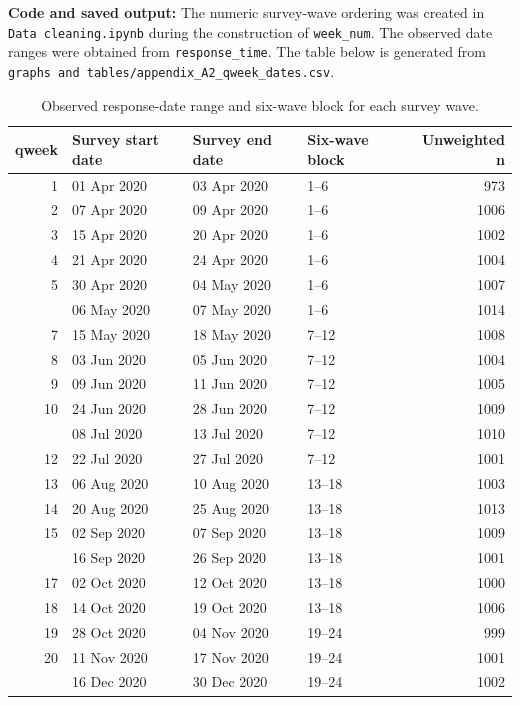 \documentclass[
  12pt,
  a4paper,
]{article}
\begin{document}
\textbf{Code and saved output:} The numeric survey-wave ordering was created
in \texttt{Data\ cleaning.ipynb} during the construction of \texttt{week\_num}. The
observed date ranges were obtained from \texttt{response\_time}. The table below
is generated from \texttt{graphs\ and\ tables/appendix\_A2\_qweek\_dates.csv}.

\begin{longtable}[t]{rlllr}
\caption{\label{tab:qweek-dates}Observed response-date range and six-wave block for each survey wave.}\\
\toprule
qweek & Survey start date & Survey end date & Six-wave block & Unweighted n\\
\midrule
1 & 01 Apr 2020 & 03 Apr 2020 & 1--6 & 973\\
2 & 07 Apr 2020 & 09 Apr 2020 & 1--6 & 1006\\
3 & 15 Apr 2020 & 20 Apr 2020 & 1--6 & 1002\\
4 & 21 Apr 2020 & 24 Apr 2020 & 1--6 & 1004\\
5 & 30 Apr 2020 & 04 May 2020 & 1--6 & 1007\\
\addlinespace
6 & 06 May 2020 & 07 May 2020 & 1--6 & 1014\\
7 & 15 May 2020 & 18 May 2020 & 7--12 & 1008\\
8 & 03 Jun 2020 & 05 Jun 2020 & 7--12 & 1004\\
9 & 09 Jun 2020 & 11 Jun 2020 & 7--12 & 1005\\
10 & 24 Jun 2020 & 28 Jun 2020 & 7--12 & 1009\\
\addlinespace
11 & 08 Jul 2020 & 13 Jul 2020 & 7--12 & 1010\\
12 & 22 Jul 2020 & 27 Jul 2020 & 7--12 & 1001\\
13 & 06 Aug 2020 & 10 Aug 2020 & 13--18 & 1003\\
14 & 20 Aug 2020 & 25 Aug 2020 & 13--18 & 1013\\
15 & 02 Sep 2020 & 07 Sep 2020 & 13--18 & 1009\\
\addlinespace
16 & 16 Sep 2020 & 26 Sep 2020 & 13--18 & 1001\\
17 & 02 Oct 2020 & 12 Oct 2020 & 13--18 & 1000\\
18 & 14 Oct 2020 & 19 Oct 2020 & 13--18 & 1006\\
19 & 28 Oct 2020 & 04 Nov 2020 & 19--24 & 999\\
20 & 11 Nov 2020 & 17 Nov 2020 & 19--24 & 1001\\
\addlinespace
21 & 16 Dec 2020 & 30 Dec 2020 & 19--24 & 1002\\

\end{longtable}
\end{document}

